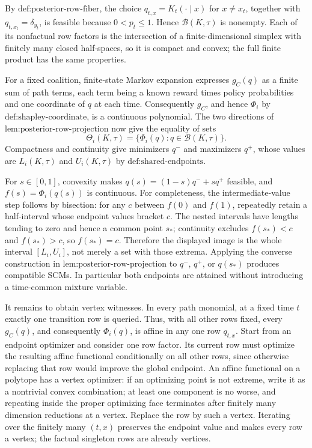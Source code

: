 By \(\text{def:posterior-row-fiber}\), the choice \(q_{t,x}=K_t(\cdot\mid x)\) for \(x\ne x_t\), together with \(q_{t,x_t}=\delta_{y_t}\), is feasible because \(0<p_t\le1\).  Hence \(\mathcal B(K,\tau)\) is nonempty.  Each of its nonfactual row factors is the intersection of a finite-dimensional simplex with finitely many closed half-spaces, so it is compact and convex; the full finite product has the same properties.

For a fixed coalition, finite-state Markov expansion expresses \(g_C(q)\) as a finite sum of path terms, each term being a known reward times policy probabilities and one coordinate of \(q\) at each time.  Consequently \(g_C\), and hence \(\Phi_i\) by \(\text{def:shapley-coordinate}\), is a continuous polynomial.  The two directions of \(\text{lem:posterior-row-projection}\) now give the equality of sets
\[
 \Theta_i(K,\tau)=\{\Phi_i(q):q\in\mathcal B(K,\tau)\}.
\]
Compactness and continuity give minimizers \(q^-\) and maximizers \(q^+\), whose values are \(L_i(K,\tau)\) and \(U_i(K,\tau)\) by \(\text{def:shared-endpoints}\).

For \(s\in[0,1]\), convexity makes \(q(s)=(1-s)q^-+sq^+\) feasible, and \(f(s)=\Phi_i(q(s))\) is continuous.  For completeness, the intermediate-value step follows by bisection: for any \(c\) between \(f(0)\) and \(f(1)\), repeatedly retain a half-interval whose endpoint values bracket \(c\).  The nested intervals have lengths tending to zero and hence a common point \(s_*\); continuity excludes \(f(s_*)<c\) and \(f(s_*)>c\), so \(f(s_*)=c\).  Therefore the displayed image is the whole interval \([L_i,U_i]\), not merely a set with those extrema.  Applying the converse construction in \(\text{lem:posterior-row-projection}\) to \(q^-\), \(q^+\), or \(q(s_*)\) produces compatible SCMs.  In particular both endpoints are attained without introducing a time-common mixture variable.

It remains to obtain vertex witnesses.  In every path monomial, at a fixed time \(t\) exactly one transition row is queried.  Thus, with all other rows fixed, every \(g_C(q)\), and consequently \(\Phi_i(q)\), is affine in any one row \(q_{t,x}\).  Start from an endpoint optimizer and consider one row factor.  Its current row must optimize the resulting affine functional conditionally on all other rows, since otherwise replacing that row would improve the global endpoint.  An affine functional on a polytope has a vertex optimizer: if an optimizing point is not extreme, write it as a nontrivial convex combination; at least one component is no worse, and repeating inside the proper optimizing face terminates after finitely many dimension reductions at a vertex.  Replace the row by such a vertex.  Iterating over the finitely many \((t,x)\) preserves the endpoint value and makes every row a vertex; the factual singleton rows are already vertices.

